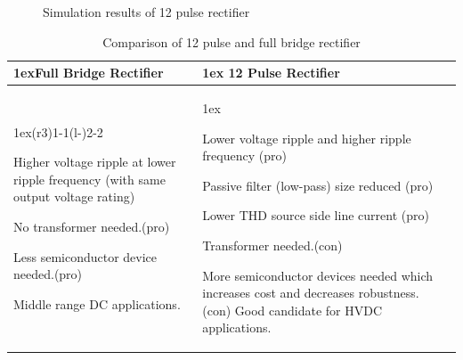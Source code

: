 \documentclass[fleqn, a4paper]{report}
\begin{document}
\begin{figure}[H]%
    \centering
    \qquad
    \caption{Simulation results of 12 pulse rectifier}%
    \label{fig:example}%
\end{figure}
\begin{table}[H]
\begin{tabularx}{\linewidth}{>{\parskip1ex}X@{\kern4\tabcolsep}>{\parskip1ex}X}
\toprule
\hfil\bfseries Full Bridge Rectifier
&
\hfil\bfseries 12 Pulse Rectifier
\\\cmidrule(r{3\tabcolsep}){1-1}\cmidrule(l{-\tabcolsep}){2-2}

Higher voltage ripple at lower ripple frequency (with same output voltage rating)\par
No transformer needed.(pro)\par
Less semiconductor device needed.(pro)\par
Middle range DC applications. 
&

Lower voltage ripple and higher ripple frequency (pro)\par
Passive filter (low-pass) size reduced (pro)\par
Lower THD source side line current (pro) \par
Transformer needed.(con)\par
More semiconductor devices needed which increases cost and decreases robustness. (con)
Good candidate for HVDC applications. 

\\\bottomrule
\end{tabularx}
\caption{Comparison of 12 pulse and full bridge rectifier}
\end{table}
\end{document}
